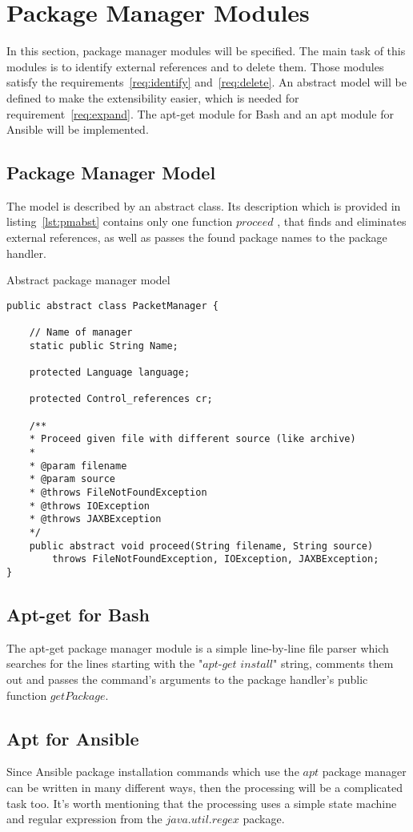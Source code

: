 \section{Package Manager Modules}
In this section, package manager modules will be specified.
The main task of this modules is to identify external references and to delete them.
Those modules satisfy the requirements~\ref{req:identify} and~\ref{req:delete}.
An abstract model will be defined to make the extensibility easier, which is needed for requirement~\ref{req:expand}.
The apt-get module for Bash and an apt module for Ansible will be implemented.
\subsection*{Package Manager Model}
The model is described by an abstract class.
Its description which is provided in listing~\ref{lst:pmabst} contains only one function $proceed$ , that finds and eliminates external references, as well as passes the found package names to the package handler.
\begin{Listing}
	\caption{Abstract package manager model}
	\label{lst:pmabst}
\begin{lstlisting}
public abstract class PacketManager {
	
	// Name of manager
	static public String Name;
	
	protected Language language;
	
	protected Control_references cr;
	
	/**
	* Proceed given file with different source (like archive)
	* 
	* @param filename
	* @param source
	* @throws FileNotFoundException
	* @throws IOException
	* @throws JAXBException
	*/
	public abstract void proceed(String filename, String source) 
		throws FileNotFoundException, IOException, JAXBException;
}
\end{lstlisting}
\end{Listing}
\subsection*{Apt-get for Bash}
The apt-get package manager module is a simple line-by-line file parser which searches for the lines starting with the "$apt$-$get$ $install$" string, comments them out and passes the command's arguments to the package handler's public function $getPackage$. 
\subsection*{Apt for Ansible}
Since Ansible package installation commands which use the $apt$ package manager can be written in many different ways, then the processing will be a complicated task too.
It's worth mentioning that the processing uses a simple state machine and regular expression from the $java$.$util$.$regex$ package.

